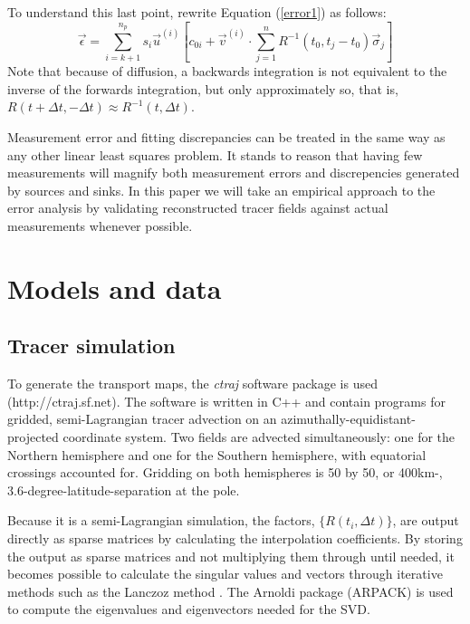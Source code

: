 \documentclass{article}
\begin{document}
To understand this last point, rewrite Equation (\ref{error1}) as follows:
\begin{equation}
	\vec \epsilon = \sum_{i=k+1}^{n_p} s_i \vec u^{(i)} \left [c_{0i}
	+ \vec v^{(i)} \cdot \sum_{j=1}^n R^{-1}(t_0, t_j-t_0) \vec \sigma_j \right ]
\end{equation}
Note that because of diffusion, 
a backwards integration is not equivalent to the inverse of the
forwards integration, but only approximately so, that is,
$R(t+\Delta t, -\Delta t) \approx R^{-1}(t, \Delta t)$.

Measurement error and fitting discrepancies can be treated in the same way 
as any other linear least squares problem. 
It stands to reason that having few measurements will magnify both
measurement errors and discrepencies generated by sources and sinks.
In this paper we will take an empirical approach to the error analysis by
validating reconstructed tracer fields against actual measurements whenever
possible.

\section{Models and data}

\subsection{Tracer simulation}

To generate the transport maps, the \textit{ctraj} software package is used (http://ctraj.sf.net).  
The software is written in C++ and contain programs
for gridded, semi-Lagrangian tracer advection on an 
azimuthally-equidistant-projected coordinate system.
Two fields are advected simultaneously: one for the Northern hemisphere
and one for the Southern hemisphere, with equatorial crossings accounted for.
Gridding on both hemispheres is 50 by 50, or 400km-,
3.6-degree-latitude-separation at the pole.

Because it is a semi-Lagrangian simulation, the factors, $\lbrace R(t_i,\Delta t) \rbrace$,
are output directly as sparse matrices by calculating the interpolation coefficients.
By storing the output as sparse matrices and not multiplying them through until
needed, it becomes possible to calculate the singular values and vectors through iterative
methods such as the Lanczoz method \citep{Golub_Van_Loan1996}.
The Arnoldi package (ARPACK) \citep{Lehoucq_Scott1996} is used to compute the
eigenvalues and eigenvectors needed for the SVD.
\end{document}
